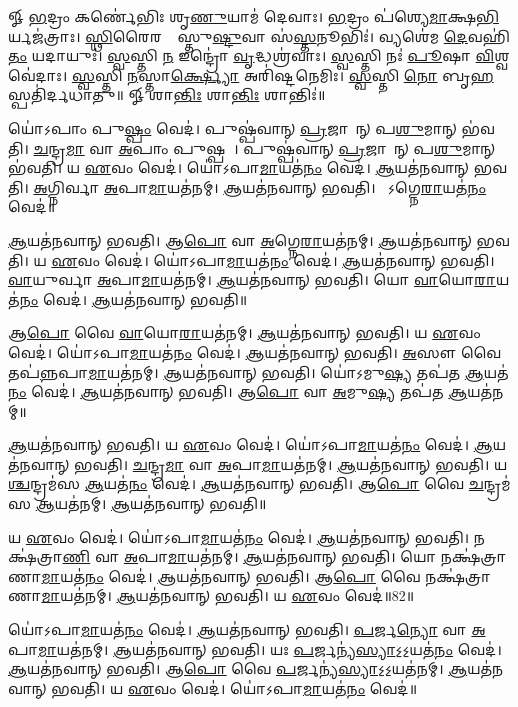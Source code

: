 


𑍐 \ul{𑌭}𑌦𑍍𑌰𑌂 𑌕𑌰𑍍𑌣𑍇॑𑌭𑌿𑌃 𑌶𑍃\ul{𑌣𑍁}𑌯𑌾𑌮॑ 𑌦𑍇𑌵𑌾𑌃। \ul{𑌭}𑌦𑍍𑌰𑌂 𑌪॑𑌶𑍍𑌯𑍇\ul{𑌮𑌾}𑌕𑍍𑌷\ul{𑌭𑌿}𑌰𑍍𑌯𑌜॑𑌤𑍍𑌰𑌾𑌃। 
\ul{𑌸𑍍𑌥𑌿}𑌰𑍈𑌰𑌙𑍍𑌗𑍈᳚𑌸𑍍𑌤𑍁\ul{𑌷𑍍𑌟𑍁}𑌵𑌾 𑌸॑\ul{𑌸𑍍𑌤}𑌨𑍂𑌭𑌿𑌃॑। 𑌵𑍍𑌯𑌶𑍇॑𑌮 \ul{𑌦𑍇}𑌵𑌹𑌿॑\ul{𑌤𑌂} 𑌯𑌦𑌾𑌯𑍁𑌃॑। 
\ul{𑌸𑍍𑌵}𑌸𑍍𑌤𑌿 \ul{𑌨} 𑌇𑌨𑍍𑌦𑍍𑌰𑍋॑ \ul{𑌵𑍃}𑌦𑍍𑌧𑌶𑍍𑌰॑𑌵𑌾𑌃। \ul{𑌸𑍍𑌵}𑌸𑍍𑌤𑌿 𑌨𑌃॑ \ul{𑌪𑍂}𑌷𑌾 \ul{𑌵𑌿}𑌶𑍍𑌵𑌵𑍇॑𑌦𑌾𑌃। 
\ul{𑌸𑍍𑌵}𑌸𑍍𑌤𑌿 \ul{𑌨}𑌸𑍍𑌤𑌾\ul{𑌰𑍍𑌕𑍍𑌷𑍍𑌯𑍋} 𑌅𑌰𑌿॑𑌷𑍍𑌟𑌨𑍇𑌮𑌿𑌃। \ul{𑌸𑍍𑌵}𑌸𑍍𑌤𑌿 \ul{𑌨𑍋} 𑌬𑍃\ul{𑌹}𑌸𑍍𑌪𑌤𑌿॑𑌰𑍍𑌦𑌧𑌾𑌤𑍁॥
𑍐 𑌶𑌾\ul{𑌨𑍍𑌤𑌿𑌃} 𑌶𑌾\ul{𑌨𑍍𑌤𑌿𑌃} 𑌶𑌾𑌨𑍍𑌤𑌿𑌃॑॥


𑌯𑍋॑𑌽𑌪𑌾𑌂 𑌪𑍁\ul{𑌷𑍍𑌪𑌂} 𑌵𑍇𑌦॑। 𑌪𑍁𑌷𑍍𑌪॑𑌵𑌾𑌨𑍍‌ \ul{𑌪𑍍𑌰}𑌜𑌾𑌵𑌾᳚𑌨𑍍 𑌪\ul{𑌶𑍁}𑌮𑌾𑌨𑍍 𑌭॑𑌵𑌤𑌿। 
\ul{𑌚}𑌨𑍍𑌦𑍍𑌰\ul{𑌮𑌾} 𑌵𑌾 \ul{𑌅}𑌪𑌾𑌂 𑌪𑍁𑌷𑍍𑌪𑌮𑍍᳚। 𑌪𑍁𑌷𑍍𑌪॑𑌵𑌾𑌨𑍍 \ul{𑌪𑍍𑌰}𑌜𑌾𑌵𑌾᳚𑌨𑍍 𑌪\ul{𑌶𑍁}𑌮𑌾𑌨𑍍‌ 𑌭॑𑌵𑌤𑌿। 
𑌯 \ul{𑌏}𑌵𑌂 𑌵𑍇𑌦॑। 𑌯𑍋॑𑌽𑌪𑌾\ul{𑌮𑌾}𑌯𑌤॑\ul{𑌨𑌂} 𑌵𑍇𑌦॑। 
\ul{𑌆}𑌯𑌤॑𑌨𑌵𑌾𑌨𑍍‌ 𑌭𑌵𑌤𑌿। \ul{𑌅}𑌗𑍍𑌨𑌿𑌰𑍍𑌵𑌾 \ul{𑌅}𑌪𑌾\ul{𑌮𑌾}𑌯𑌤॑𑌨𑌮𑍍। 
\ul{𑌆}𑌯𑌤॑𑌨𑌵𑌾𑌨𑍍‌ 𑌭𑌵𑌤𑌿। 𑌯𑍋᳚𑌽𑌗𑍍𑌨𑍇\ul{𑌰𑌾}𑌯𑌤॑\ul{𑌨𑌂} 𑌵𑍇𑌦॑॥


\ul{𑌆}𑌯𑌤॑𑌨𑌵𑌾𑌨𑍍‌ 𑌭𑌵𑌤𑌿। 𑌆\ul{𑌪𑍋} 𑌵𑌾 \ul{𑌅}𑌗𑍍𑌨𑍇\ul{𑌰𑌾}𑌯𑌤॑𑌨𑌮𑍍‌। 
\ul{𑌆}𑌯𑌤॑𑌨𑌵𑌾𑌨𑍍‌ 𑌭𑌵𑌤𑌿। 𑌯 \ul{𑌏}𑌵𑌂 𑌵𑍇𑌦॑। 
𑌯𑍋॑𑌽𑌪𑌾\ul{𑌮𑌾}𑌯𑌤॑\ul{𑌨𑌂} 𑌵𑍇𑌦॑। \ul{𑌆}𑌯𑌤॑𑌨𑌵𑌾𑌨𑍍‌ 𑌭𑌵𑌤𑌿। 
\ul{𑌵𑌾}𑌯𑍁𑌰𑍍𑌵𑌾 \ul{𑌅}𑌪𑌾\ul{𑌮𑌾}𑌯𑌤॑𑌨𑌮𑍍। \ul{𑌆}𑌯𑌤॑𑌨𑌵𑌾𑌨𑍍‌ 𑌭𑌵𑌤𑌿। 
𑌯𑍋 \ul{𑌵𑌾}𑌯𑍋\ul{𑌰𑌾}𑌯𑌤॑\ul{𑌨𑌂} 𑌵𑍇𑌦॑। \ul{𑌆}𑌯𑌤॑𑌨𑌵𑌾𑌨𑍍‌ 𑌭𑌵𑌤𑌿॥


𑌆\ul{𑌪𑍋} 𑌵𑍈 \ul{𑌵𑌾}𑌯𑍋\ul{𑌰𑌾}𑌯𑌤॑𑌨𑌮𑍍। \ul{𑌆}𑌯𑌤॑𑌨𑌵𑌾𑌨𑍍‌ 𑌭𑌵𑌤𑌿। 
𑌯 \ul{𑌏}𑌵𑌂 𑌵𑍇𑌦॑। 𑌯𑍋॑𑌽𑌪𑌾\ul{𑌮𑌾}𑌯𑌤॑\ul{𑌨𑌂} 𑌵𑍇𑌦॑। 
\ul{𑌆}𑌯𑌤॑𑌨𑌵𑌾𑌨𑍍‌ 𑌭𑌵𑌤𑌿। \ul{𑌅}𑌸𑍗 𑌵𑍈 𑌤𑌪॑\ul{𑌨𑍍𑌨}𑌪𑌾\ul{𑌮𑌾}𑌯𑌤॑𑌨𑌮𑍍। 
\ul{𑌆}𑌯𑌤॑𑌨𑌵𑌾𑌨𑍍‌ 𑌭𑌵𑌤𑌿। 𑌯𑍋॑𑌽𑌮𑍁\ul{𑌷𑍍𑌯} 𑌤𑌪॑𑌤 \ul{𑌆}𑌯𑌤॑\ul{𑌨𑌂} 𑌵𑍇𑌦॑। 
\ul{𑌆}𑌯𑌤॑𑌨𑌵𑌾𑌨𑍍‌ 𑌭𑌵𑌤𑌿। 𑌆\ul{𑌪𑍋} 𑌵𑌾 \ul{𑌅}𑌮𑍁\ul{𑌷𑍍𑌯} 𑌤𑌪॑𑌤 \ul{𑌆}𑌯𑌤॑𑌨𑌮𑍍॥



\ul{𑌆}𑌯𑌤॑𑌨𑌵𑌾𑌨𑍍‌ 𑌭𑌵𑌤𑌿। 𑌯 \ul{𑌏}𑌵𑌂 𑌵𑍇𑌦॑। 
𑌯𑍋॑𑌽𑌪𑌾\ul{𑌮𑌾}𑌯𑌤॑\ul{𑌨𑌂} 𑌵𑍇𑌦॑। \ul{𑌆}𑌯𑌤॑𑌨𑌵𑌾𑌨𑍍‌ 𑌭𑌵𑌤𑌿। 
\ul{𑌚}𑌨𑍍𑌦𑍍𑌰\ul{𑌮𑌾} 𑌵𑌾 \ul{𑌅}𑌪𑌾\ul{𑌮𑌾}𑌯𑌤॑𑌨𑌮𑍍‌। \ul{𑌆}𑌯𑌤॑𑌨𑌵𑌾𑌨𑍍‌ 𑌭𑌵𑌤𑌿। 
𑌯\ul{𑌶𑍍𑌚}𑌨𑍍𑌦𑍍𑌰𑌮॑𑌸 \ul{𑌆}𑌯𑌤॑\ul{𑌨𑌂} 𑌵𑍇𑌦॑। \ul{𑌆}𑌯𑌤॑𑌨𑌵𑌾𑌨𑍍‌ 𑌭𑌵𑌤𑌿। 
𑌆\ul{𑌪𑍋} 𑌵𑍈 \ul{𑌚}𑌨𑍍𑌦𑍍𑌰𑌮॑𑌸 \ul{𑌆}𑌯𑌤॑𑌨𑌮𑍍। \ul{𑌆}𑌯𑌤॑𑌨𑌵𑌾𑌨𑍍‌ 𑌭𑌵𑌤𑌿॥



𑌯 \ul{𑌏}𑌵𑌂 𑌵𑍇𑌦॑। 𑌯𑍋॑𑌽𑌪𑌾\ul{𑌮𑌾}𑌯𑌤॑\ul{𑌨𑌂} 𑌵𑍇𑌦॑। 
\ul{𑌆}𑌯𑌤॑𑌨𑌵𑌾𑌨𑍍‌ 𑌭𑌵𑌤𑌿। 𑌨𑌕𑍍𑌷॑𑌤𑍍𑌰𑌾\ul{𑌣𑌿} 𑌵𑌾 \ul{𑌅}𑌪𑌾\ul{𑌮𑌾}𑌯𑌤॑𑌨𑌮𑍍। 
\ul{𑌆}𑌯𑌤॑𑌨𑌵𑌾𑌨𑍍‌ 𑌭𑌵𑌤𑌿। 𑌯𑍋 𑌨𑌕𑍍𑌷॑𑌤𑍍𑌰𑌾𑌣𑌾\ul{𑌮𑌾}𑌯𑌤॑\ul{𑌨𑌂} 𑌵𑍇𑌦॑। 
\ul{𑌆}𑌯𑌤॑𑌨𑌵𑌾𑌨𑍍‌ 𑌭𑌵𑌤𑌿। 𑌆\ul{𑌪𑍋} 𑌵𑍈 𑌨𑌕𑍍𑌷॑𑌤𑍍𑌰𑌾𑌣𑌾\ul{𑌮𑌾}𑌯𑌤॑𑌨𑌮𑍍। 
\ul{𑌆}𑌯𑌤॑𑌨𑌵𑌾𑌨𑍍‌ 𑌭𑌵𑌤𑌿। 𑌯 \ul{𑌏}𑌵𑌂 𑌵𑍇𑌦॑॥82॥


𑌯𑍋॑𑌽𑌪𑌾\ul{𑌮𑌾}𑌯𑌤॑\ul{𑌨𑌂} 𑌵𑍇𑌦॑। \ul{𑌆}𑌯𑌤॑𑌨𑌵𑌾𑌨𑍍‌ 𑌭𑌵𑌤𑌿।
\ul{𑌪}𑌰𑍍𑌜\ul{𑌨𑍍𑌯𑍋} 𑌵𑌾 \ul{𑌅}𑌪𑌾\ul{𑌮𑌾}𑌯𑌤॑𑌨𑌮𑍍। \ul{𑌆}𑌯𑌤॑𑌨𑌵𑌾𑌨𑍍‌ 𑌭𑌵𑌤𑌿। 
𑌯𑌃 \ul{𑌪}𑌰𑍍𑌜𑌨𑍍𑌯॑\ul{𑌸𑍍𑌯𑌾}𑌽॒𑌽॒𑌯𑌤॑\ul{𑌨𑌂} 𑌵𑍇𑌦॑। \ul{𑌆}𑌯𑌤॑𑌨𑌵𑌾𑌨𑍍‌ 𑌭𑌵𑌤𑌿। 
𑌆\ul{𑌪𑍋} 𑌵𑍈 \ul{𑌪}𑌰𑍍𑌜𑌨𑍍𑌯॑\ul{𑌸𑍍𑌯𑌾}𑌽॒𑌽॒𑌯𑌤॑𑌨𑌮𑍍। \ul{𑌆}𑌯𑌤॑𑌨𑌵𑌾𑌨𑍍‌ 𑌭𑌵𑌤𑌿। 
𑌯 \ul{𑌏}𑌵𑌂 𑌵𑍇𑌦॑। 𑌯𑍋॑𑌽𑌪𑌾\ul{𑌮𑌾}𑌯𑌤॑\ul{𑌨𑌂} 𑌵𑍇𑌦॑॥



